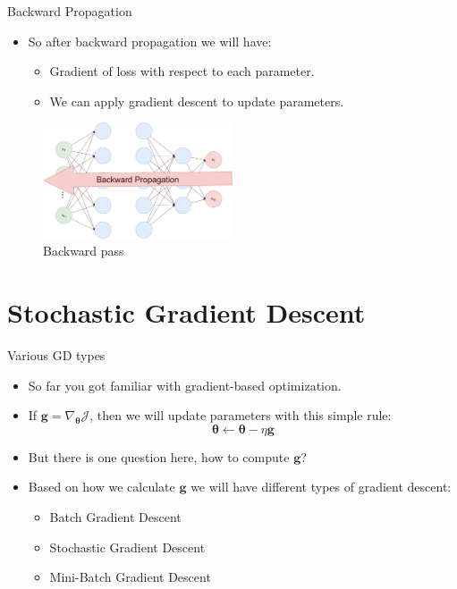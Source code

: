 \documentclass[compress,oilve,t]{beamer}
\begin{document}
\begin{frame}{Backward Propagation}
	\begin{itemize}
		\item So after backward propagation we will have:
		\begin{itemize}
			\item Gradient of loss with respect to each parameter.
			\item We can apply gradient descent to update parameters.
		\end{itemize}
	\end{itemize}
	\begin{figure}[H]
		\includegraphics[width=0.5\textwidth]{Figs/backward_propagation.png}
		\caption{Backward pass}
	\end{figure}
\end{frame}


\section{Stochastic Gradient Descent}
\begin{frame}{Various GD types}
	\begin{itemize}
		\item So far you got familiar with gradient-based optimization.
		\item If $\bm{g} = \nabla_{\bm{\theta}} \mathcal{J}$, then we will update parameters with this simple rule:
		\[
		\bm{\theta} \gets \bm{\theta} - \eta\bm{g}
		\]
		\item But there is one question here, how to compute $\bm{g}$?
		\item Based on how we calculate $\bm{g}$ we will have different types of gradient descent:
		\begin{itemize}
			\item Batch Gradient Descent
			\item Stochastic Gradient Descent
			\item Mini-Batch Gradient Descent
		\end{itemize}
	\end{itemize}
\end{frame}
\end{document}
